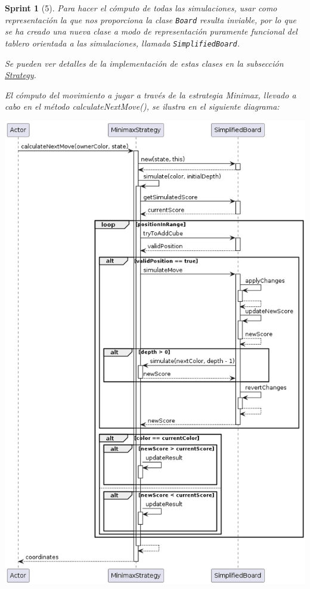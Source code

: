 \documentclass[12pt,a4paper,openright]{book}
\theoremstyle{break}
\newtheorem*{sprint}{Sprint}
\begin{document}
\begin{sprint}[5]
Para hacer el cómputo de todas las simulaciones, usar como representación la que nos proporciona la clase \texttt{Board} resulta inviable, por lo que se ha creado una nueva clase a modo de representación puramente funcional del tablero orientada a las simulaciones, llamada \texttt{SimplifiedBoard}.

Se pueden ver detalles de la implementación de estas clases en la subsección \hyperref[subsec:Strategy]{Strategy}.

El cómputo del movimiento a jugar a través de la estrategia Minimax, llevado a cabo en el método calculateNextMove(), se ilustra en el siguiente diagrama:

\begin{center}
\centering
\includegraphics[scale=0.45]{MinimaxStrategy.calculateNextMove()-sprint5.png}
\end{center}

\end{sprint}
\end{document}

